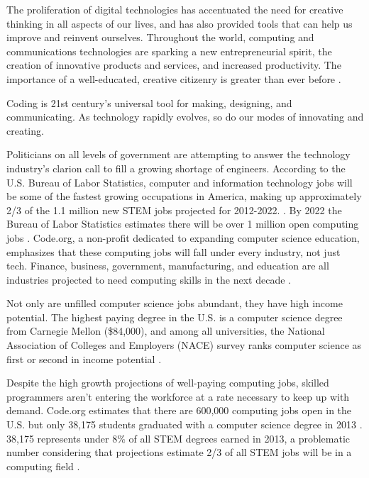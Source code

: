 \begin{blockquote} 
The proliferation of digital technologies has accentuated the need for creative thinking in all aspects of our lives, and has also provided tools that can help us improve and reinvent ourselves. Throughout the world, computing and communications technologies are sparking a new entrepreneurial spirit, the creation of innovative products and services, and increased productivity. The importance of a well-educated, creative citizenry is greater than ever before \cite{resdig}.
\end{blockquote}
Coding is 21st century's universal tool for making, designing, and communicating. As technology rapidly evolves, so do our modes of innovating and creating. \par

Politicians on all levels of government are attempting to answer the technology industry's clarion call to fill a growing shortage of engineers. According to the U.S. Bureau of Labor Statistics, computer and information technology jobs will be some of the fastest growing occupations in America, making up approximately 2/3 of the 1.1 million new STEM jobs projected for 2012-2022. \cite{laborstats}. By 2022 the Bureau of Labor Statistics estimates there will be over 1 million open computing jobs \cite{laborstats}. Code.org, a non-profit dedicated to expanding computer science education, emphasizes that these computing jobs will fall under every industry, not just tech. Finance, business, government, manufacturing, and education are all industries projected to need computing skills in the next decade \cite{codeorgstats}.\par
Not only are unfilled computer science jobs abundant, they have high income potential. The highest paying degree in the U.S. is a computer science degree from Carnegie Mellon (\$84,000), and among all universities, the National Association of Colleges and Employers (NACE) survey ranks computer science as first or second in income potential \cite{forbeshigh}. \par
Despite the high growth projections of well-paying computing jobs, skilled programmers aren't entering the workforce at a rate necessary to keep up with demand. Code.org estimates that there are 600,000 computing jobs open in the U.S. but only 38,175 students graduated with a computer science degree in 2013 \cite{codeorgstats}. 38,175 represents under 8\% of all STEM degrees earned in 2013, a problematic number considering that projections estimate 2/3 of all STEM jobs will be in a computing field \cite{laborstats}. \par

